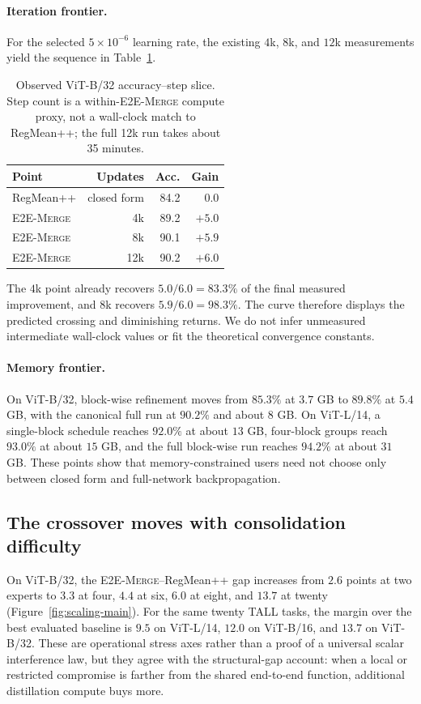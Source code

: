 \documentclass[letterpaper]{article} %
\newcommand{\method}{\textup{\textsc{E2E-Merge}}\xspace}
\theoremstyle{plain}
\theoremstyle{definition}
\begin{document}
\paragraph{Iteration frontier.}
For the selected $5\times10^{-6}$ learning rate, the existing $4$k, $8$k, and $12$k measurements yield the sequence in Table~\ref{tab:step-increments}.
\begin{table}[tb]
\centering
\small
\setlength{\tabcolsep}{4pt}
\begin{tabular*}{\columnwidth}{@{\extracolsep{\fill}}lrrr}
\toprule
Point & Updates & Acc. & Gain \\
\midrule
RegMean++ & closed form & 84.2 & 0.0 \\
\method & 4k & 89.2 & $+5.0$ \\
\method & 8k & 90.1 & $+5.9$ \\
\method & 12k & 90.2 & $+6.0$ \\
\bottomrule
\end{tabular*}
\caption{Observed ViT-B/32 accuracy--step slice. Step count is a within-\method compute
proxy, not a wall-clock match to RegMean++; the full 12k run takes about 35 minutes.}
\label{tab:step-increments}
\end{table}
The $4$k point already recovers $5.0/6.0=83.3\%$ of the final measured improvement, and $8$k recovers $5.9/6.0=98.3\%$.
The curve therefore displays the predicted crossing and diminishing returns.
We do not infer unmeasured intermediate wall-clock values or fit the theoretical convergence constants.

\paragraph{Memory frontier.}
On ViT-B/32, block-wise refinement moves from $85.3\%$ at $3.7$ GB to $89.8\%$ at $5.4$ GB, with the canonical full run at $90.2\%$ and about $8$ GB.
On ViT-L/14, a single-block schedule reaches $92.0\%$ at about $13$ GB, four-block groups reach $93.0\%$ at about $15$ GB, and the full block-wise run reaches $94.2\%$ at about $31$ GB.
These points show that memory-constrained users need not choose only between closed form and full-network backpropagation.

\subsection{The crossover moves with consolidation difficulty}
\label{sec:difficulty-frontier}

On ViT-B/32, the \method--RegMean++ gap increases from $2.6$ points at two experts to $3.3$ at four, $4.4$ at six, $6.0$ at eight, and $13.7$ at twenty (Figure~\ref{fig:scaling-main}).
For the same twenty TALL tasks, the margin over the best evaluated baseline is $9.5$ on ViT-L/14, $12.0$ on ViT-B/16, and $13.7$ on ViT-B/32.
These are operational stress axes rather than a proof of a universal scalar interference law, but they agree with the structural-gap account: when a local or restricted compromise is farther from the shared end-to-end function, additional distillation compute buys more.
\end{document}

